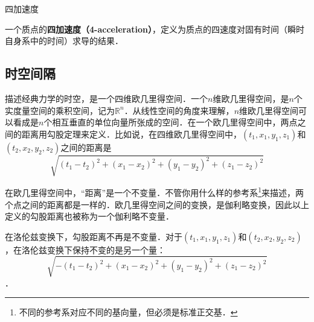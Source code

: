 \begin{definition}{四加速度}

一个质点的\textbf{四加速度（4-acceleration）}，定义为质点的四速度对固有时间（瞬时自身系中的时间）求导的结果．

\end{definition}

\subsection{时空间隔}

描述经典力学的时空，是一个四维欧几里得空间．一个$n$维欧几里得空间，是$n$个实度量空间的乘积空间，记为$\mathbb{R}^n$．从线性空间的角度来理解，$n$维欧几里得空间可以看成是$n$个相互垂直的单位向量所张成的空间．在一个欧几里得空间中，两点之间的距离用勾股定理来定义．比如说，在四维欧几里得空间中，$(t_1, x_1, y_1, z_1)$和$(t_2, x_2, y_2, z_2)$之间的距离是$$\sqrt{(t_1-t_2)^2+(x_1-x_2)^2+(y_1-y_2)^2+(z_1-z_2)^2}$$

在欧几里得空间中，“距离”是一个不变量．不管你用什么样的参考系\footnote{不同的参考系对应不同的基向量，但必须是标准正交基．}来描述，两个点之间的距离都是一样的．欧几里得空间之间的变换，是伽利略变换，因此以上定义的勾股距离也被称为一个伽利略不变量．

在洛伦兹变换下，勾股距离不再是不变量．对于$(t_1, x_1, y_1, z_1)$和$(t_2, x_2, y_2, z_2)$，在洛伦兹变换下保持不变的是另一个量：$$\sqrt{-(t_1-t_2)^2+(x_1-x_2)^2+(y_1-y_2)^2+(z_1-z_2)^2}$$．

